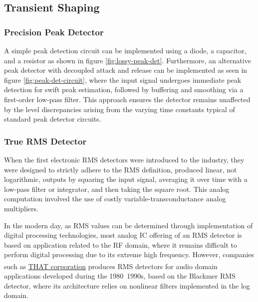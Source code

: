 \documentclass[10pt]{article}
\begin{document}
\begin{multicols*}{2}
\begin{minipage}{\linewidth}
                            \label{plot:tanh}
                        
                        \end{minipage}
            
            \subsection{Transient Shaping}

                \subsubsection{Precision Peak Detector}
                    A simple peak detection circuit can be implemented using a diode, a capacitor, and a resistor as shown in figure \ref{fig:lossy-peak-det}. Furthermore, an alternative peak detector with decoupled attack and release can be implemented as seen in figure \ref{fig:peak-det-circuit}, where the input signal undergoes immediate peak detection for swift peak estimation, followed by buffering and smoothing via a first-order low-pass filter. This approach ensures the detector remains unaffected by the level discrepancies arising from the varying time constants typical of standard peak detector circuits.

                \subsubsection{True RMS Detector}
                    When the first electronic RMS detectors were introduced to the industry, they were designed to strictly adhere to the RMS definition, produced linear, not logarithmic, outputs by squaring the input signal, averaging it over time with a low-pass filter or integrator, and then taking the square root. This analog computation involved the use of costly variable-transconductance analog multipliers. \cite{rms-history}\par
                    In the modern day, as RMS values can be determined through implementation of digital processing technologies, most analog IC offering of an RMS detector is based on application related to the RF domain, where it remains difficult to perform digital processing due to its extreme high frequency. However, companies such as \href{https://www.thatcorp.com/}{THAT corporation\textsuperscript{\texttrademark}} produces RMS detectors for audio domain applications developed during the 1980~1990s, based on the Blackmer RMS detector, where its architecture relies on nonlinear filters implemented in the log domain.


\end{multicols*}
\end{document}
